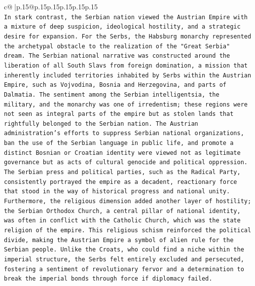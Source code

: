 \documentclass{article}
\begin{document}
{\begin{supertabular}{c@{$\;$}|p{.15\linewidth}@{}p{.15\linewidth}p{.15\linewidth}p{.15\linewidth}p{.15\linewidth}p{.15\linewidth}}
{{{\\ 
\texttt{In stark contrast, the Serbian nation viewed the Austrian Empire with a mixture of deep suspicion, ideological hostility, and a strategic desire for expansion. For the Serbs, the Habsburg monarchy represented the archetypal obstacle to the realization of the "Great Serbia" dream. The Serbian national narrative was constructed around the liberation of all South Slavs from foreign domination, a mission that inherently included territories inhabited by Serbs within the Austrian Empire, such as Vojvodina, Bosnia and Herzegovina, and parts of Dalmatia. The sentiment among the Serbian intelligentsia, the military, and the monarchy was one of irredentism; these regions were not seen as integral parts of the empire but as stolen lands that rightfully belonged to the Serbian nation. The Austrian administration's efforts to suppress Serbian national organizations, ban the use of the Serbian language in public life, and promote a distinct Bosnian or Croatian identity were viewed not as legitimate governance but as acts of cultural genocide and political oppression. The Serbian press and political parties, such as the Radical Party, consistently portrayed the empire as a decadent, reactionary force that stood in the way of historical progress and national unity. Furthermore, the religious dimension added another layer of hostility; the Serbian Orthodox Church, a central pillar of national identity, was often in conflict with the Catholic Church, which was the state religion of the empire. This religious schism reinforced the political divide, making the Austrian Empire a symbol of alien rule for the Serbian people. Unlike the Croats, who could find a niche within the imperial structure, the Serbs felt entirely excluded and persecuted, fostering a sentiment of revolutionary fervor and a determination to break the imperial bonds through force if diplomacy failed.} \\
\\ 
}}}
\end{supertabular}}
\end{document}
